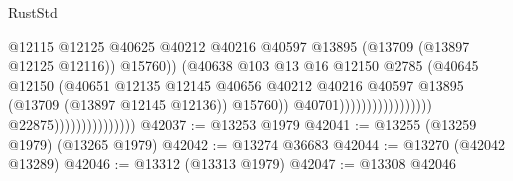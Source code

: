 \begin{lexlean}{RustStd}
\begin{coremodule}
                                                                      @12115
                                                                      @12125
                                                                      @40625
                                                                      @40212
                                                                      @40216
                                                                      @40597
                                                                      @13895
                                                                      (@13709
                                                                        (@13897 @12125 @12116))
                                                                      @15760))
                                                                  (@40638
                                                                    @103
                                                                    @13
                                                                    @16
                                                                    @12150
                                                                    @2785
                                                                    (@40645
                                                                      @12150
                                                                      (@40651
                                                                        @12135
                                                                        @12145
                                                                        @40656
                                                                        @40212
                                                                        @40216
                                                                        @40597
                                                                        @13895
                                                                        (@13709
                                                                          (@13897 @12145 @12136))
                                                                        @15760))
                                                                    @40701)))))))))))))))))
                                  @22875)))))))))))))))
@42037 := @13253 @1979
@42041 := @13255 (@13259 @1979) (@13265 @1979)
@42042 := @13274 @36683
@42044 := @13270 (@42042 @13289)
@42046 := @13312 (@13313 @1979)
@42047 := @13308 @42046

\end{coremodule}
\end{lexlean}
